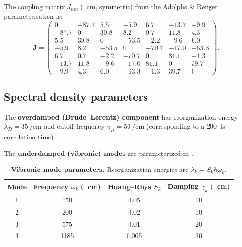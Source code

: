 \documentclass[11pt,a4paper]{article}
\begin{document}
The coupling matrix $J_{nm}$ (\si{\per\cm}, symmetric) from the Adolphs \& Renger parameterisation is:
\begin{equation}
\bm{J} = \begin{pmatrix}
	0     & -87.7 & 5.5   & -5.9  & 6.7   & -13.7 & -9.9  \\
	-87.7 & 0     & 30.8  & 8.2   & 0.7   & 11.8  & 4.3   \\
	5.5   & 30.8  & 0     & -53.5 & -2.2  & -9.6  & 6.0   \\
	-5.9  & 8.2   & -53.5 & 0     & -70.7 & -17.0 & -63.3 \\
	6.7   & 0.7   & -2.2  & -70.7 & 0     & 81.1  & -1.3  \\
	-13.7 & 11.8  & -9.6  & -17.0 & 81.1  & 0     & 39.7  \\
	-9.9  & 4.3   & 6.0   & -63.3 & -1.3  & 39.7  & 0
\end{pmatrix}.
\end{equation}

\subsection{Spectral density parameters}

The \textbf{overdamped (Drude--Lorentz) component} has reorganization energy $\lambda_D = \SI{35}{\per\cm}$ and cutoff frequency $\gamma_D = \SI{50}{\per\cm}$ (corresponding to a \SI{200}{\femto\second} correlation time).

The \textbf{underdamped (vibronic) modes} are parameterized in .

\begin{table}[ht]
\centering
\caption{\textbf{Vibronic mode parameters.} Reorganization energies are $\lambda_k = S_k \hbar \omega_k$.}
\label{tab:vibronic_modes}
\begin{tabular}{SSSS}
	\toprule
	\textbf{Mode} & \textbf{Frequency $\omega_k$ (\si{\per\cm})} & \textbf{Huang--Rhys $S_k$} & \textbf{Damping $\gamma_k$ (\si{\per\cm})} \\              & 150                                          & 0.05                       & 10                                         \\
	2             & 200                                          & 0.02                       & 10                                         \\
	3             & 575                                          & 0.01                       & 20                                         \\
	4             & 1185                                         & 0.005                      & 30                                         \\ \bottomrule
\end{tabular}
\end{table}
\end{document}

